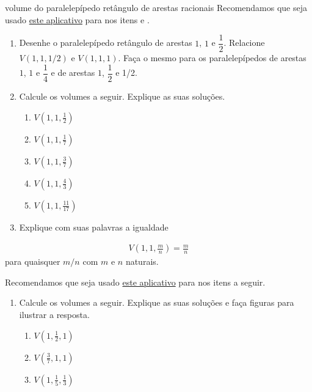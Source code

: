 \begin{task}{volume do paralelepípedo retângulo de arestas racionais}
Recomendamos que seja usado \href{https://ggbm.at/zzdv6are}{este aplicativo} para nos itens  e .
\begin{enumerate}
\item {} 
Desenhe o paralelepípedo retângulo de arestas $1$, $1$ e $\dfrac{1}{2}$. Relacione \(V(1,1,1/2)\) e \(V(1,1,1)\). Faça o mesmo para os paralelepípedos de arestas $1$, $1$ e $\dfrac{1}{4}$ e de arestas $1$, $\dfrac{1}{2}$ e 1/2.

\item {} 
Calcule os volumes a seguir. Explique as suas soluções.
\begin{enumerate}
\item {} 
\(V\left(1, 1, \frac{1}{2}\right)\)

\item {} 
\(V\left(1, 1, \frac{1}{7}\right)\)

\item {} 
\(V\left(1, 1, \frac{3}{7}\right)\)

\item {} 
\(V \left(1, 1, \frac{4}{3}\right)\)

\item {} 
\(V \left(1, 1, \frac{11}{17}\right)\)

\end{enumerate}

\item {} 
Explique com suas palavras a igualdade

\end{enumerate}
\begin{equation*}
\begin{split}\displaystyle{V \left( 1,1,\frac{m}{n} \right) = \frac{m}{n}}\end{split}
\end{equation*}
para quaisquer \(m/n\) com \(m\) e \(n\) naturais.

Recomendamos que seja usado \href{https://ggbm.at/zfaaqbr7}{este aplicativo} para nos itens a seguir.
\begin{enumerate}
\item {} 
Calcule os volumes a seguir. Explique as suas soluções e faça figuras para ilustrar a resposta.
\begin{enumerate}
\item {} 
\(V\left(1,\frac{1}{2},1\right)\)

\item {} 
\(V\left(\frac{3}{7}, 1, 1\right)\)

\item {} 
\(V\left(1,\frac{1}{5},\frac{1}{3}\right)\)


\end{enumerate}
\end{enumerate}
\end{task}
